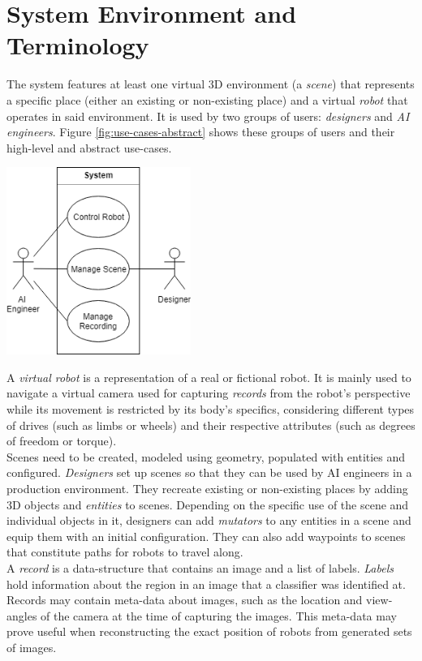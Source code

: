 \section{System Environment and Terminology}
The system features at least one virtual 3D environment (a \textit{scene}) that represents a specific place (either an existing or non-existing place) and a virtual \textit{robot} that operates in said environment. It is used by two groups of users: \textit{designers} and \textit{\ac{AI} engineers}. Figure \ref{fig:use-cases-abstract} shows these groups of users and their high-level and abstract use-cases.
\begin{center}
\noindent\includegraphics[width=6cm]{tex/img/ch04/UseCases_HighLevel_01.png}
\label{fig:use-cases-abstract}
\end{center}
A \textit{virtual robot} is a representation of a real or fictional robot. It is mainly used to navigate a virtual camera used for capturing \textit{records} from the robot's perspective while its movement is restricted by its body's specifics, considering different types of drives (such as limbs or wheels) and their respective attributes (such as degrees of freedom or torque).\\
Scenes need to be created, modeled using geometry, populated with entities and configured. \textit{Designers} set up scenes so that they can be used by \acs{AI} engineers in a production environment. They recreate existing or non-existing places by adding 3D objects and \textit{entities} to scenes. Depending on the specific use of the scene and individual objects in it, designers can add \textit{mutators} to any entities in a scene and equip them with an initial configuration. They can also add waypoints to scenes that constitute paths for robots to travel along.\\
A \textit{record} is a data-structure that contains an image and a list of labels. \textit{Labels} hold information about the region in an image that a classifier was identified at. Records may contain meta-data about images, such as the location and view-angles of the camera at the time of capturing the images. This meta-data may prove useful when reconstructing the exact position of robots from generated sets of images.
